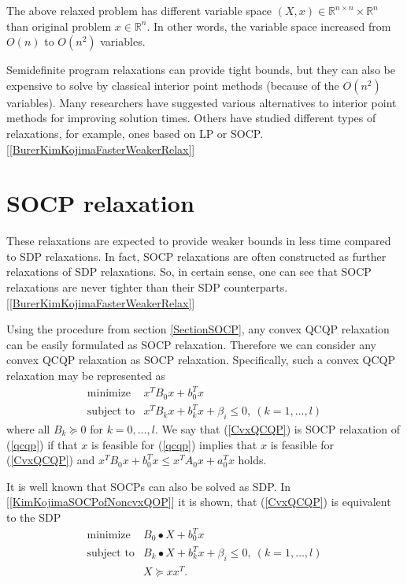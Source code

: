 \documentclass[10pt,oneside]{book}
\theoremstyle{definition}
\begin{document}
The above relaxed problem has different variable space $(X,x)\in \mathbb{R}^{n\times n}\times \mathbb{R}^n$ than original problem $x\in \mathbb{R}^n$. 
In other words, the variable space increased from $O(n)$ to $O(n^2)$ variables.

Semidefinite program relaxations can provide tight bounds, but they can also be expensive to solve by classical interior point methods (because of the $O(n^2)$ variables).
Many researchers have suggested various alternatives to interior point methods for improving solution times. Others have studied different types of relaxations, for example, ones based on LP or SOCP. [\ref{BurerKimKojimaFasterWeakerRelax}]



	

\section{SOCP relaxation}
These relaxations are expected to provide weaker bounds in less time compared to SDP relaxations. In fact, SOCP relaxations are often constructed as further relaxations of SDP relaxations. So, in certain sense, one can see that SOCP relaxations are never tighter than their SDP counterparts. [\ref{BurerKimKojimaFasterWeakerRelax}]

Using the procedure from section \ref{SectionSOCP}, any convex QCQP relaxation can be easily formulated as SOCP relaxation. Therefore we can consider any convex QCQP relaxation as SOCP relaxation. 
Specifically, such a convex QCQP relaxation may be represented as 
\begin{equation}
\label{CvxQCQP} 
\begin{array}{ll}
\mbox{minimize}& x^TB_0x + b_0^Tx \\
\mbox{subject to}& x^TB_kx + b_k^Tx + \beta_i \leq 0, \  (k = 1,\dots ,l)
\end{array} 
\end{equation}
where all $B_k\succeq 0$ for $k=0,\dots ,l$. We say that (\ref{CvxQCQP}) is SOCP relaxation of (\ref{qcqp}) if that $x$ is feasible for (\ref{qcqp}) implies that $x$ is feasible for (\ref{CvxQCQP}) and $x^TB_0x+b_0^Tx \leq x^TA_0x+a_0^Tx$ holds.

It is well known that SOCPs can also be solved as SDP. In [\ref{KimKojimaSOCPofNoncvxQOP}] it is shown, that (\ref{CvxQCQP}) is equivalent to the SDP 
\begin{equation}
\label{SDPofCvxQCQP} 
\begin{array}{ll}
\mbox{minimize}& B_0\bullet X + b_0^Tx \\
\mbox{subject to}& B_k\bullet X + b_k^Tx + \beta_i \leq 0, \  (k = 1,\dots ,l)\\
& X\succeq xx^T.
\end{array} 
\end{equation}
\end{document}

